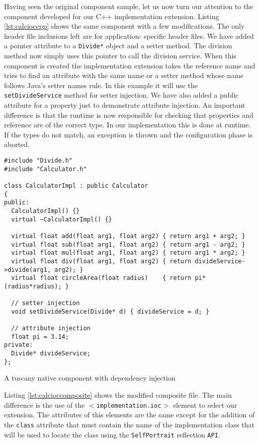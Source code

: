 Having seen the original component sample, let us now turn our attention to the component
developed for our C++ implementation extension. Listing \ref{lst:calcioccpp} shows the same
component with a few modifications. The only header file inclusions left are for application-
specific header files. We have added a pointer attribute to a \texttt{Divide*} object and a
setter method. The division method now simply uses this pointer to call the division service.
When this component is created the implementation extension takes the reference name and
tries to find an attribute with the same name or a setter method whose name follows Java's
setter names rule. In this example it will use the \texttt{setDivideService} method for
setter injection. We have also added a public attribute for a property just to demonstrate
attribute injection. An important difference is that the runtime is now responsible for
checking that properties and reference are of the correct type. In our implementation this
is done at runtime. If the types do not match, an exception is thrown and the configuration
phase is aborted.

\begin{listing}
\begin{verbatim}
#include "Divide.h"
#include "Calculator.h"

class CalculatorImpl : public Calculator
{
public:
  CalculatorImpl() {}
  virtual ~CalculatorImpl() {}

  virtual float add(float arg1, float arg2) { return arg1 + arg2; }
  virtual float sub(float arg1, float arg2) { return arg1 - arg2; }
  virtual float mul(float arg1, float arg2) { return arg1 * arg2; }
  virtual float div(float arg1, float arg2) { return divideService->divide(arg1, arg2); }
  virtual float circleArea(float radius)    { return pi*(radius*radius); }

  // setter injection
  void setDivideService(Divide* d) { divideService = d; }

  // attribute injection
  float pi = 3.14;
private:
  Divide* divideService;
};
\end{verbatim}
\caption{A tuscany native component with dependency injection}
\label{lst:calcioccpp}
\end{listing}

Listing \ref{lst:calcioccomposite} shows the modified composite file. The main difference
is the use of the \texttt{$<$implementation.ioc$>$} element to select our extension. The attributes
of this elements are the same except for the addition of the \texttt{class} attribute that must
contain the name of the implementation class that will be used to locate the class using the
\texttt{SelfPortrait} reflection \texttt{API}.

